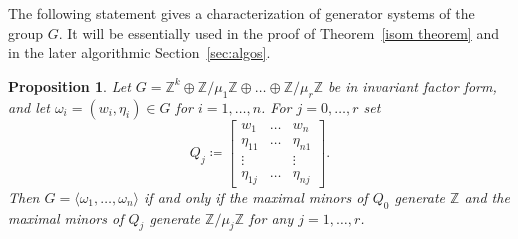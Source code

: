 \documentclass{amsart}
\newcommand{\Z}{\mathbb{Z}}
\newtheorem{proposition}[lem]{Proposition}
\theoremstyle{definition}
\begin{document}
The following statement gives a characterization of generator systems of the group $G$.
It will be essentially used in the proof of Theorem~\ref{isom theorem} and in the later
algorithmic Section~\ref{sec:algos}.


\begin{proposition}\label{generation condition}
    Let $G=\Z^k\oplus \Z/\mu_1\Z\oplus\dots\oplus\Z/\mu_r\Z$ be in invariant factor form, and let $\omega_i=(w_i,\eta_i)\in G$ for $i=1,\dots,n$. For $j=0,\dots,r$ set
    $$
    Q_j\coloneqq \begin{bmatrix}
        w_1 &\dots &w_n\\
        \eta_{11} & \dots & \eta_{n1}\\
        \vdots & & \vdots\\
        \eta_{1j} & \dots & \eta_{nj}
    \end{bmatrix}.
    $$
    Then $G=\langle \omega_1,\dots,\omega_n\rangle$ if and only if the maximal minors of $Q_0$ generate $\Z$ and the maximal minors of $Q_j$ generate $\Z/\mu_j\Z$ for any $j=1,\dots,r$. 
\end{proposition}
\end{document}
